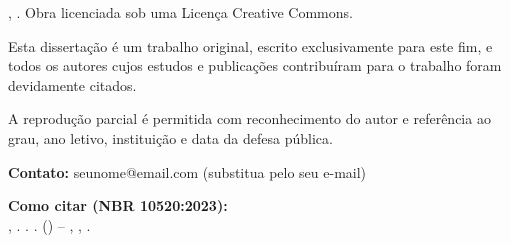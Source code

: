 \begingroup 
\makeatletter

\begin{center}
  \begin{minipage}{0.9\textwidth}
    \normalsize 
    \setlength{\parindent}{0pt} 
    
    \scalebox{1.65}{\ccbyncnd}
    
    \vspace{1em}
    
    \@autor, \@UNIDADEENSINO{}.
    \noindent Obra licenciada sob uma Licença Creative Commons. \@ano
    
    \vspace{1em}
    
    Esta dissertação é um trabalho original, escrito exclusivamente para este fim, e todos os autores cujos estudos e publicações contribuíram para o trabalho foram devidamente citados.
    
    A reprodução parcial é permitida com reconhecimento do autor e referência ao grau, ano letivo, instituição e data da defesa pública.
    
    \vspace{1em}
    
    \textbf{Contato:} seunome@email.com (substitua pelo seu e-mail)
    
    \vspace{1em}
    
    \textbf{Como citar (NBR 10520:2023):}\\
    \@autorsobrenome, \@autorprenome. \textit{\@titulo}. \@ano. \@monopt{} (\@degnamept) -- \@UNIFEI, \@CIDADE, \@ano.
    
  \end{minipage}
\end{center}

\vfill 

